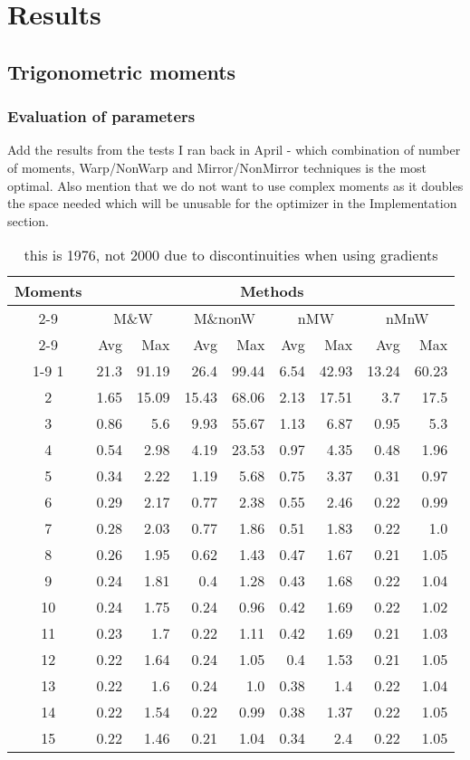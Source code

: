 \chapter{Results}

\section{Trigonometric moments}

\subsection{Evaluation of parameters}

Add the results from the tests I ran back in April - which combination of number of moments, Warp/NonWarp and Mirror/NonMirror techniques is the most optimal. Also mention that we do not want to use complex moments as it doubles the space needed which will be unusable for the optimizer in the Implementation section. 

\begin{table}[t]
	\centering
	\begin{tabular}{crrrrrrrr}
		\toprule
		\multirow{4}{*}{Moments} &
		\multicolumn{8}{c}{Methods} \\
		\cmidrule(lr){2-9}
		&\multicolumn{2}{c}{M\&W} &
		\multicolumn{2}{c}{M\&nonW} &
		\multicolumn{2}{c}{nMW} &
		\multicolumn{2}{c}{nMnW}\\
		\cmidrule(lr){2-9}
		& Avg & Max & Avg & Max & Avg & Max & Avg & Max \\
		\cmidrule(lr){1-9}
		1&21.3&91.19&26.4&99.44&6.54&42.93&13.24&60.23\\
		2&1.65&15.09&15.43&68.06&2.13&17.51&3.7&17.5\\
		3&0.86&5.6&9.93&55.67&1.13&6.87&0.95&5.3\\
		4&0.54&2.98&4.19&23.53&0.97&4.35&0.48&1.96\\
		5&0.34&2.22&1.19&5.68&0.75&3.37&0.31&0.97\\
		6&0.29&2.17&0.77&2.38&0.55&2.46&0.22&0.99\\
		7&0.28&2.03&0.77&1.86&0.51&1.83&0.22&1.0\\
		8&0.26&1.95&0.62&1.43&0.47&1.67&0.21&1.05\\
		9&0.24&1.81&0.4&1.28&0.43&1.68&0.22&1.04\\
		10&0.24&1.75&0.24&0.96&0.42&1.69&0.22&1.02\\
		11&0.23&1.7&0.22&1.11&0.42&1.69&0.21&1.03\\
		12&0.22&1.64&0.24&1.05&0.4&1.53&0.21&1.05\\
		13&0.22&1.6&0.24&1.0&0.38&1.4&0.22&1.04\\
		14&0.22&1.54&0.22&0.99&0.38&1.37&0.22&1.05\\
		15&0.22&1.46&0.21&1.04&0.34&2.4&0.22&1.05\\
		\bottomrule
	\end{tabular}
\caption{this is 1976, not 2000 due to discontinuities when using gradients}
\end{table}

